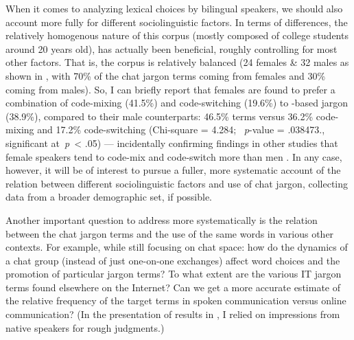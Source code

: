 \documentclass[output=paper,newtxmath,modfonts,nonflat,hidelinks]{langsci/langscibook}
\begin{document}
When it comes to analyzing lexical choices by bilingual speakers, we should also account more fully for different sociolinguistic factors. In terms of  differences, the relatively homogenous nature of this corpus (mostly composed of college students around 20 years old), has actually been beneficial, roughly controlling for most other factors. That is, the corpus is relatively balanced (24 females \& 32 males as shown in , with 70\% of the chat jargon terms coming from females and 30\% coming from males). So, I can briefly report that females are found to prefer a combination of code-mixing (41.5\%) and code-switching (19.6\%) to -based jargon (38.9\%), compared to their male counterparts: 46.5\%  terms versus 36.2\%  code-mixing and 17.2\% code-switching (Chi-square = 4.284; ~\textit{p}{}-value = .038473., significant at~\textit{p}~< .05) — incidentally confirming findings in other studies that female speakers tend to code-mix and code-switch more than men \citep{ahmeh2015,hamdani2012,wong2006}. In any case, however, it will be of interest to pursue a fuller, more systematic account of the relation between different sociolinguistic factors and use of chat jargon, collecting data from a broader demographic set, if possible. 

Another important question to address more systematically is the relation between the chat jargon terms and the use of the same words in various other contexts. For example, while still focusing on chat space: how do the dynamics of a chat group (instead of just one-on-one exchanges) affect word choices and the promotion of particular jargon terms? To what extent are the various IT jargon terms found elsewhere on the Internet? Can we get a more accurate estimate of the relative frequency of the target terms in spoken communication versus online communication? (In the presentation of results in , I relied on impressions from native speakers for rough judgments.) 
\end{document}
